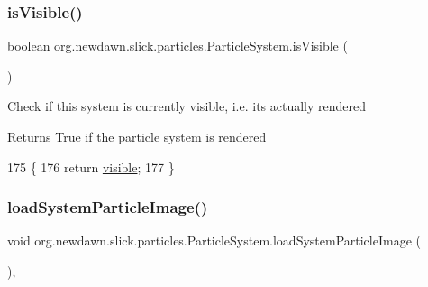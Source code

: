 \subsubsection{\texorpdfstring{is\+Visible()}{isVisible()}}
{\footnotesize\ttfamily boolean org.\+newdawn.\+slick.\+particles.\+Particle\+System.\+is\+Visible (\begin{DoxyParamCaption}{ }\end{DoxyParamCaption})\hspace{0.3cm}{\ttfamily [inline]}}

Check if this system is currently visible, i.\+e. it\textquotesingle{}s actually rendered

\begin{DoxyReturn}{Returns}
True if the particle system is rendered 
\end{DoxyReturn}

\begin{DoxyCode}
175                                \{
176         \textcolor{keywordflow}{return} \mbox{\hyperlink{classorg_1_1newdawn_1_1slick_1_1particles_1_1_particle_system_ad2769d90adecc35330066468f02ac881}{visible}};
177     \}
\end{DoxyCode}
\mbox{\label{classorg_1_1newdawn_1_1slick_1_1particles_1_1_particle_system_a9a78c23b6536f783a8d02bee7bf5cd2e}} 
\subsubsection{\texorpdfstring{load\+System\+Particle\+Image()}{loadSystemParticleImage()}}
{\footnotesize\ttfamily void org.\+newdawn.\+slick.\+particles.\+Particle\+System.\+load\+System\+Particle\+Image (\begin{DoxyParamCaption}{ }\end{DoxyParamCaption})\hspace{0.3cm}{\ttfamily [inline]}, {\ttfamily [private]}}

